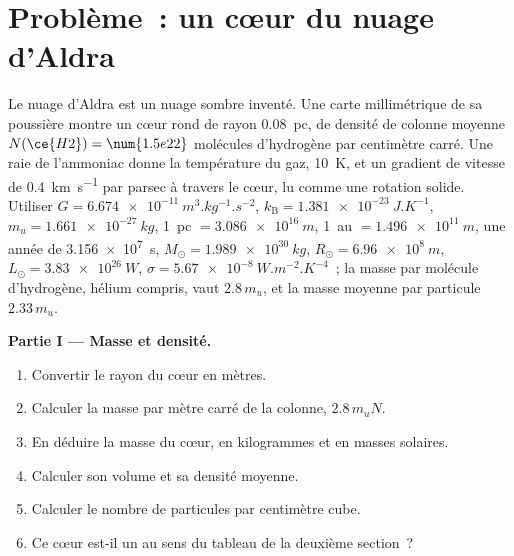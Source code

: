 \section{Problème~: un cœur du nuage d'Aldra}

\begin{problem}
\label{pb:b2:ism-star-formation:1}
Le nuage d'Aldra est un nuage sombre inventé. Une carte millimétrique de sa
poussière montre un cœur rond de rayon \qty{0.08}{pc}, de densité de colonne moyenne $N(\ce{H2}) = \num{1.5e22}$ molécules d'hydrogène par centimètre carré.
Une raie de l'ammoniac donne la température du gaz, \qty{10}{K}, et un gradient de vitesse de \qty{0.4}{km.s^{-1}} par parsec à travers le cœur, lu comme une rotation solide. Utiliser $G = \qty{6.674e-11}{m^3.kg^{-1}.s^{-2}}$,
$k_{\mathrm B} = \qty{1.381e-23}{J.K^{-1}}$, $m_u = \qty{1.661e-27}{kg}$, \qty{1}{pc} $= \qty{3.086e16}{m}$, \qty{1}{au} $= \qty{1.496e11}{m}$, une année de \qty{3.156e7}{s}, $M_\odot = \qty{1.989e30}{kg}$, $R_\odot = \qty{6.96e8}{m}$, $L_\odot = \qty{3.83e26}{W}$, $\sigma = \qty{5.67e-8}{W.m^{-2}.K^{-4}}$~;
la masse par molécule d'hydrogène, hélium compris, vaut $2.8\,m_u$,
et
la
masse
moyenne
par
particule
$2.33\,m_u$.

\medskip
\noindent\textbf{Partie I --- Masse et densité.}
\begin{enumerate}
  \item Convertir le rayon du cœur en mètres.
  \item Calculer la masse par mètre carré de la colonne, $2.8\,m_u N$.
  \item En déduire la masse du cœur, en kilogrammes et en masses solaires.
  \item Calculer son volume et sa densité moyenne.
  \item Calculer le nombre de particules par centimètre cube.
  \item Ce cœur est-il un  au sens du tableau de la deuxième section~?
\end{enumerate}


\end{problem}
